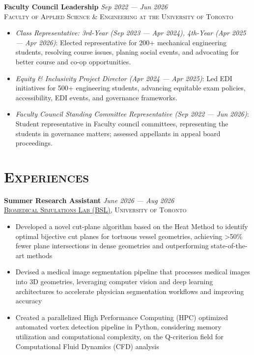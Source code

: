\documentclass[letterpaper, 10pt]{article}
\newcommand{\vspa}{\vspace{0.1cm}}
\begin{document}
	\vspa 

	\textbf{Faculty Council Leadership} \hfill \textit{Sep 2022 --- Jun 2026} \\
	\textsc{Faculty of Applied Science \& Engineering at the University of Toronto}
	\begin{itemize}
		\item \textit{Class Representative: 3rd-Year (Sep 2023 --- Apr 2024), 4th-Year (Apr 2025 --- Apr 2026)}: Elected representative for 200+ mechanical engineering students, resolving course issues, planing social events, and advocating for better course and co-op opportunities.	
		
		\item \textit{Equity \& Inclusivity Project Director (Apr 2024 --- Apr 2025)}: Led EDI initiatives for 500+ engineering students, advancing equitable exam policies, accessibility, EDI events, and governance frameworks.
		
		\item \textit{Faculty Council Standing Committee Representative (Sep 2022 --- Jun 2026)}: Student representative in Faculty council committees, representing the students in governance matters; assessed appellants in appeal board proceedings.
	\end{itemize}

	\vspa
	
	\section*{\faBriefcase \quad \textsc{Experiences}}
	\textbf{Summer Research Assistant} \hfill \textit{June 2026 --- Aug 2026} \\
	\textsc{\href{https://bsl.mie.utoronto.ca/}{Biomedical Simulations Lab (BSL)}, University of Toronto}
	\begin{itemize}
		\item Developed a novel cut-plane algorithm based on the Heat Method to identify optimal bijective cut planes for tortuous vessel geometries, achieving >50\% fewer plane intersections in dense geometries and outperforming state-of-the-art methods
		
		\item Devised a medical image segmentation pipeline that processes medical images into 3D geometries, leveraging computer vision and deep learning architectures to accelerate physician segmentation workflows and improving accuracy
		
		\item Created a parallelized High Performance Computing (HPC) optimized automated vortex detection pipeline in Python, considering memory utilization and computational complexity, on the Q-criterion field for Computational Fluid Dynamics (CFD) analysis
	\end{itemize}
	
\end{document}
